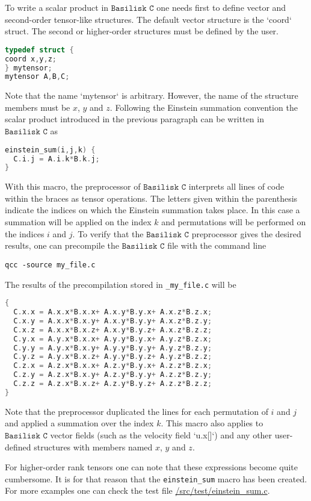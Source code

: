 To write a scalar product in $\texttt{Basilisk C}$ one needs first to define vector and second-order tensor-like structures. The default vector structure is the `coord` struct. The second or higher-order structures must be defined by the user. 
\begin{lstlisting}[language=C]
typedef struct {
coord x,y,z;
} mytensor;
mytensor A,B,C; 
\end{lstlisting}
Note that the name `mytensor` is arbitrary. However, the name of the structure members must be $x$, $y$ and $z$. Following the Einstein summation convention the scalar product introduced in the previous paragraph can be written in $\texttt{Basilisk C}$ as
\begin{lstlisting}[language=C]
einstein_sum(i,j,k) {
  C.i.j = A.i.k*B.k.j; 
}
\end{lstlisting}
With this macro, the preprocessor of $\texttt{Basilisk C}$ interprets all lines of code within the braces as tensor operations. The letters given within the parenthesis indicate the indices on which the Einstein summation takes place. In this case a summation will be applied on the index $k$ and permutations will be performed on the indices $i$ and $j$. 
To verify that the $\texttt{Basilisk C}$ preprocessor gives the desired results, one can precompile the $\texttt{Basilisk C}$ file with the command line
\begin{lstlisting}
qcc -source my_file.c
\end{lstlisting}
The results of the precompilation stored in \texttt{\_my\_file.c} will be
\begin{lstlisting}[language=C]
{
  C.x.x = A.x.x*B.x.x+ A.x.y*B.y.x+ A.x.z*B.z.x;
  C.x.y = A.x.x*B.x.y+ A.x.y*B.y.y+ A.x.z*B.z.y;
  C.x.z = A.x.x*B.x.z+ A.x.y*B.y.z+ A.x.z*B.z.z;
  C.y.x = A.y.x*B.x.x+ A.y.y*B.y.x+ A.y.z*B.z.x;
  C.y.y = A.y.x*B.x.y+ A.y.y*B.y.y+ A.y.z*B.z.y;
  C.y.z = A.y.x*B.x.z+ A.y.y*B.y.z+ A.y.z*B.z.z;
  C.z.x = A.z.x*B.x.x+ A.z.y*B.y.x+ A.z.z*B.z.x;
  C.z.y = A.z.x*B.x.y+ A.z.y*B.y.y+ A.z.z*B.z.y;
  C.z.z = A.z.x*B.x.z+ A.z.y*B.y.z+ A.z.z*B.z.z;
}
\end{lstlisting}
Note that the preprocessor duplicated the lines for each permutation of $i$ and $j$ and applied a summation over the index $k$. This macro also applies to $\texttt{Basilisk C}$ vector fields (such as the velocity field `u.x[]`) and any other user-defined structures with members named $x$, $y$ and $z$.

For higher-order rank tensors one can note that these expressions become quite cumbersome.
It is for that reason that the \texttt{einstein\_sum} macro has been created. 
For more examples one can check the test file \href{einstein\_sum.c}{/src/test/einstein\_sum.c}.

